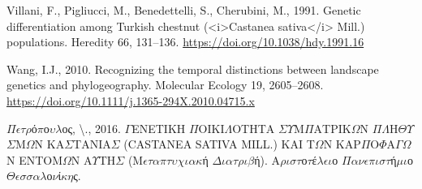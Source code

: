 \documentclass[12pt,a4paper,]{report}
\begin{document}
\leavevmode\hypertarget{ref-Villani1991}{}%
Villani, F., Pigliucci, M., Benedettelli, S., Cherubini, M., 1991.
Genetic differentiation among Turkish chestnut
(\textless{}i\textgreater{}Castanea sativa\textless{}/i\textgreater{}
Mill.) populations. Heredity 66, 131--136.
\url{https://doi.org/10.1038/hdy.1991.16}

\leavevmode\hypertarget{ref-Wang2010a}{}%
Wang, I.J., 2010. Recognizing the temporal distinctions between
landscape genetics and phylogeography. Molecular Ecology 19, 2605--2608.
\url{https://doi.org/10.1111/j.1365-294X.2010.04715.x}

\leavevmode\hypertarget{ref-2016a}{}%
\(\Pi\)\(\epsilon\)\(\tau\)\(\rho\)ό\(\pi\)ο\(\upsilon\)\(\lambda\)ος,
\textbackslash{}., 2016. \(\Gamma\)ΕΝΕΤΙΚΗ \(\Pi\)ΟΙΚΙ\(\Lambda\)ΟΤΗΤΑ
\(\Sigma\)\(\Upsilon\)Μ\(\Pi\)ΑΤΡΙΚ\(\Omega\)Ν
\(\Pi\)\(\Lambda\)Η\(\Theta\)\(\Upsilon\)\(\Sigma\)Μ\(\Omega\)Ν
ΚΑ\(\Sigma\)ΤΑΝΙΑ\(\Sigma\) (CASTANEA SATIVA MILL.) ΚΑΙ Τ\(\Omega\)Ν
ΚΑΡ\(\Pi\)Ο\(\Phi\)Α\(\Gamma\)\(\Omega\)Ν ΕΝΤΟΜ\(\Omega\)Ν
Α\(\Upsilon\)ΤΗ\(\Sigma\)
(M\(\epsilon\)\(\tau\)\(\alpha\)\(\pi\)\(\tau\)\(\upsilon\)\(\chi\)\(\iota\)\(\alpha\)\(\kappa\)ή
\(\Delta\)\(\iota\)\(\alpha\)\(\tau\)\(\rho\)\(\iota\)\(\beta\)ή).
Α\(\rho\)\(\iota\)\(\sigma\)\(\tau\)ο\(\tau\)έ\(\lambda\)\(\epsilon\)\(\iota\)ο
\(\Pi\)\(\alpha\)\(\nu\)\(\epsilon\)\(\pi\)\(\iota\)\(\sigma\)\(\tau\)ή\(\mu\)\(\iota\)ο
\(\Theta\)\(\epsilon\)\(\sigma\)\(\sigma\)\(\alpha\)\(\lambda\)ο\(\nu\)ί\(\kappa\)\(\eta\)ς.
\end{document}
